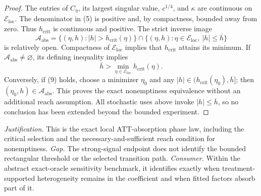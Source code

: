 \documentclass{article}
\begin{document}
\begin{proof}
The entries of \(C_\eta\), its largest singular value, \(c^{1/4}\), and \(\kappa\) are continuous on \(\mathcal E_{\mathrm{loc}}\).  The denominator in (5) is positive and, by compactness, bounded away from zero.  Thus \(h_{\mathrm{crit}}\) is continuous and positive.  The strict inverse image
\[
 \mathcal A_{\mathrm{abs}}
 =\{(\eta,h):|h|>h_{\mathrm{crit}}(\eta)\}
 \cap\{(\eta,h):\eta\in\mathcal E_{\mathrm{loc}},\ |h|\leq\overline h\}
\]
is relatively open.  Compactness of \(\mathcal E_{\mathrm{loc}}\) implies that \(h_{\mathrm{crit}}\) attains its minimum.  If \(\mathcal A_{\mathrm{abs}}\neq\varnothing\), its defining inequality implies
\[
 \overline h>\min_{\eta\in\mathcal E_{\mathrm{loc}}}h_{\mathrm{crit}}(\eta). \tag{9}
\]
Conversely, if (9) holds, choose a minimizer \(\eta_0\) and any \(|h|\in(h_{\mathrm{crit}}(\eta_0),\overline h]\); then \((\eta_0,h)\in\mathcal A_{\mathrm{abs}}\).  This proves the exact nonemptiness equivalence without an additional reach assumption.  All stochastic uses above invoke \(|h|\leq\overline h\), so no conclusion has been extended beyond the bounded experiment.
\end{proof}
\par\smallskip\noindent \textit{Justification.} This is the exact local ATT-absorption phase law, including the critical selection and the necessary-and-sufficient reach condition for nonemptiness. \textit{Gap.} The strong-signal endpoint does not identify the bounded rectangular threshold or the selected transition path. \textit{Consumer.} Within the abstract exact-oracle sensitivity benchmark, it identifies exactly when treatment-supported heterogeneity remains in the coefficient and when fitted factors absorb part of it.
\end{document}
